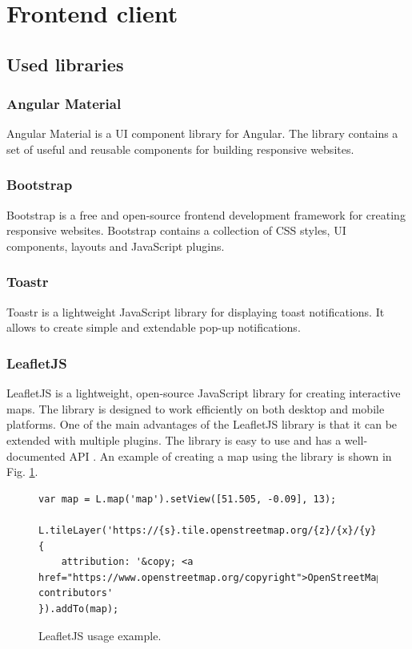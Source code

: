 \documentclass[a4paper,twoside,12pt]{book}
\begin{document}
\section{Frontend client}

\subsection{Used libraries}

\subsubsection{Angular Material}

Angular Material is a UI component library for Angular. The library contains a set of useful and reusable components for building responsive websites.

\subsubsection{Bootstrap}

Bootstrap is a free and open-source frontend development framework for creating responsive websites. Bootstrap contains a collection of CSS styles, UI components, layouts and JavaScript plugins. 

\subsubsection{Toastr}

Toastr is a lightweight JavaScript library for displaying toast notifications. It allows to create simple and extendable pop-up notifications.

\subsubsection{LeafletJS}

LeafletJS is a lightweight, open-source JavaScript library for creating interactive maps. The library is designed to work efficiently on both desktop and mobile platforms. One of the main advantages of the LeafletJS library is that it can be extended with multiple plugins. The library is easy to use and has a well-documented API \cite{bib:leaflet}. An example of creating a map using the library is shown in Fig. \ref{fig:leafletMap}.

\begin{figure}[htb]
\centering
\begin{lstlisting}
var map = L.map('map').setView([51.505, -0.09], 13);

L.tileLayer('https://{s}.tile.openstreetmap.org/{z}/{x}/{y}.png', {
    attribution: '&copy; <a href="https://www.openstreetmap.org/copyright">OpenStreetMap</a> contributors'
}).addTo(map);
\end{lstlisting}
\caption{LeafletJS usage example.}
\label{fig:leafletMap}
\end{figure}
\end{document}
